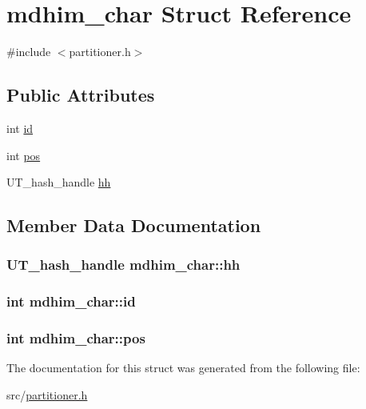 \hypertarget{structmdhim__char}{\section{mdhim\-\_\-char Struct Reference}
\label{d8/d9f/structmdhim__char}
}


{\ttfamily \#include $<$partitioner.\-h$>$}

\subsection*{Public Attributes}
\begin{DoxyCompactItemize}
\item 
int \hyperlink{structmdhim__char_a61f3233391107b90ad4435ab7e23e0de}{id}
\item 
int \hyperlink{structmdhim__char_ace52abc0569a3c95cfadda1fce10b2aa}{pos}
\item 
U\-T\-\_\-hash\-\_\-handle \hyperlink{structmdhim__char_a78216045f803c2d64b46ea70661bf5f9}{hh}
\end{DoxyCompactItemize}


\subsection{Member Data Documentation}
\hypertarget{structmdhim__char_a78216045f803c2d64b46ea70661bf5f9}{
\subsubsection[{hh}]{\setlength{\rightskip}{0pt plus 5cm}U\-T\-\_\-hash\-\_\-handle mdhim\-\_\-char\-::hh}}\label{d8/d9f/structmdhim__char_a78216045f803c2d64b46ea70661bf5f9}
\hypertarget{structmdhim__char_a61f3233391107b90ad4435ab7e23e0de}{
\subsubsection[{id}]{\setlength{\rightskip}{0pt plus 5cm}int mdhim\-\_\-char\-::id}}\label{d8/d9f/structmdhim__char_a61f3233391107b90ad4435ab7e23e0de}
\hypertarget{structmdhim__char_ace52abc0569a3c95cfadda1fce10b2aa}{
\subsubsection[{pos}]{\setlength{\rightskip}{0pt plus 5cm}int mdhim\-\_\-char\-::pos}}\label{d8/d9f/structmdhim__char_ace52abc0569a3c95cfadda1fce10b2aa}


The documentation for this struct was generated from the following file\-:\begin{DoxyCompactItemize}
\item 
src/\hyperlink{partitioner_8h}{partitioner.\-h}\end{DoxyCompactItemize}
